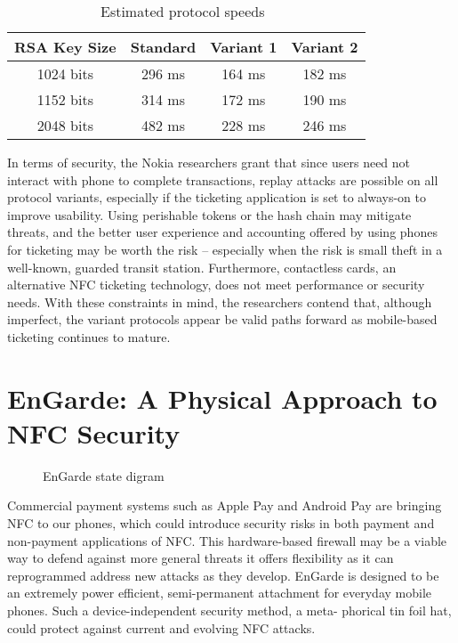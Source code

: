 \documentclass{sig-alternate}
\begin{document}
\begin{table}
  \centering
  \caption{Estimated protocol speeds~\cite{Ticket2011}}
  \label{tab:speedTable}
  \begin{tabular}{c|c|c|c}
    RSA Key Size & Standard & Variant 1 & Variant 2\\
    \hline
    1024 bits & 296 ms & 164 ms & 182 ms\\
    1152 bits & 314 ms & 172 ms & 190 ms\\
    2048 bits & 482 ms & 228 ms & 246 ms\\
  \end{tabular}
\end{table}

In terms of security, the Nokia researchers grant that since users need not interact with phone to complete transactions, replay attacks are possible on all protocol variants, especially if the ticketing application is set to always-on to improve usability. Using perishable tokens or the hash chain may mitigate threats, and the better user experience and accounting offered by using phones for ticketing may be worth the risk -- especially when the risk is small theft in a well-known, guarded transit station. Furthermore, contactless cards, an alternative NFC ticketing technology, does not meet performance or security needs. With these constraints in mind, the researchers contend that, although imperfect, the variant protocols appear be valid paths forward as mobile-based ticketing continues to mature.


\section{EnGarde: A Physical Approach to NFC Security}
\label{sec:enGarde}

\begin{figure}
\centering
{}
\caption{EnGarde\cite{Gum2013} state digram}
\label{fig:states}
\end{figure}


Commercial payment systems such as Apple Pay and Android Pay are bringing NFC to our phones, which could introduce security risks in both payment and non-payment applications of NFC. This hardware-based firewall may be a viable way to defend against more general threats it offers flexibility as it can reprogrammed address new attacks as they develop. EnGarde is designed to be an extremely power efficient, semi-permanent attachment for everyday mobile phones. Such a device-independent security method, a meta- phorical tin foil hat, could protect against current and evolving NFC attacks.~\cite{Gum2013}
\end{document}
